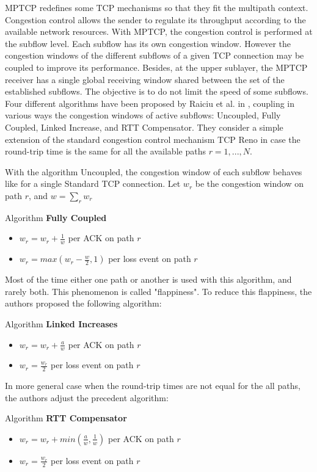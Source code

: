 \documentclass{sig-alternate}
\begin{document}
MPTCP redefines some TCP mechanisms so that they fit the multipath context. 
Congestion control allows the sender to regulate its throughput according to the available network resources. 
With MPTCP, the congestion control is performed at the subflow level. Each subflow has its own congestion window. However the congestion windows of the different subflows of a given TCP connection may be coupled to improve its performance. 
Besides, at the upper sublayer, the MPTCP receiver has a  single global receiving window shared between the set of the established subflows. The objective is to do not limit the speed of some subflows.
Four different algorithms have been proposed by Raiciu et al. in \cite{raiciu09}, coupling in various ways the congestion windows of active subflows: Uncoupled, Fully Coupled, Linked Increase, and RTT Compensator. They consider a simple extension of the standard congestion control mechanism TCP Reno  in case the round-trip time is the same for all the available paths $r = 1,..., N$. 

With the algorithm Uncoupled, the congestion window of each subflow behaves like for a single Standard TCP connection. 
Let $w_r$ be the congestion window on path $r$, and $w = \sum_r w_r$

Algorithm {\bf Fully Coupled}
\begin{itemize}
\item $w_r = w_r + \frac{1}{w}$ per ACK on path $r$
\item $w_r = max(w_r - \frac{w}{2}, 1)$ per loss event on path $r$
\end{itemize}

Most of the time either one path or another is used with this algorithm, and rarely both. This phenomenon is called "flappiness". To reduce this flappiness, the authors proposed the following algorithm:

Algorithm {\bf Linked Increases} \cite{raiciu10}
\begin{itemize}
\item $w_r = w_r + \frac{a}{w}$ per ACK on path $r$
\item $w_r = \frac{w_r}{2}$ per loss event on path $r$
\end{itemize}

In more general case when the round-trip times are not equal for the all paths, the authors adjust the precedent algorithm:

Algorithm {\bf RTT Compensator}
\begin{itemize}
\item $w_r = w_r + min(\frac{a}{w}, \frac{1}{w})$ per ACK on path $r$
\item $w_r = \frac{w_r}{2}$ per loss event on path $r$
\end{itemize}
\end{document}
